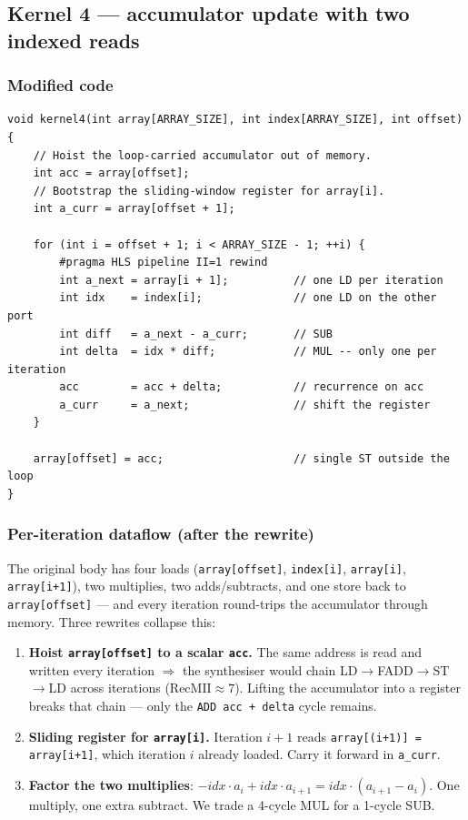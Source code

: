 \documentclass[11pt,a4paper]{article}
\begin{document}
\subsection{Kernel 4 --- accumulator update with two indexed reads}

\subsubsection*{Modified code}

\begin{lstlisting}
void kernel4(int array[ARRAY_SIZE], int index[ARRAY_SIZE], int offset) {
    // Hoist the loop-carried accumulator out of memory.
    int acc = array[offset];
    // Bootstrap the sliding-window register for array[i].
    int a_curr = array[offset + 1];

    for (int i = offset + 1; i < ARRAY_SIZE - 1; ++i) {
        #pragma HLS pipeline II=1 rewind
        int a_next = array[i + 1];          // one LD per iteration
        int idx    = index[i];              // one LD on the other port
        int diff   = a_next - a_curr;       // SUB
        int delta  = idx * diff;            // MUL -- only one per iteration
        acc        = acc + delta;           // recurrence on acc
        a_curr     = a_next;                // shift the register
    }

    array[offset] = acc;                    // single ST outside the loop
}
\end{lstlisting}

\subsubsection*{Per-iteration dataflow (after the rewrite)}

The original body has four loads (\texttt{array[offset]}, \texttt{index[i]}, \texttt{array[i]}, \texttt{array[i+1]}), two multiplies, two adds/subtracts, and one store back to \texttt{array[offset]} --- and every iteration round-trips the accumulator through memory. Three rewrites collapse this:

\begin{enumerate}
  \item \textbf{Hoist \texttt{array[offset]} to a scalar \texttt{acc}.} The same address is read and written every iteration $\Rightarrow$ the synthesiser would chain LD$\to$FADD$\to$ST$\to$LD across iterations ($\mathrm{RecMII} \approx 7$). Lifting the accumulator into a register breaks that chain --- only the \texttt{ADD acc + delta} cycle remains.
  \item \textbf{Sliding register for \texttt{array[i]}.} Iteration $i+1$ reads \texttt{array[(i+1)] = array[i+1]}, which iteration $i$ already loaded. Carry it forward in \texttt{a\_curr}.
  \item \textbf{Factor the two multiplies}: $-idx \cdot a_i + idx \cdot a_{i+1} = idx \cdot (a_{i+1} - a_i)$. One multiply, one extra subtract. We trade a 4-cycle MUL for a 1-cycle SUB.
\end{enumerate}
\end{document}
